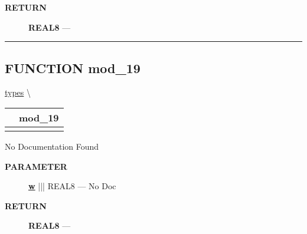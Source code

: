 \par
\begin{description}
\item [\colorbox{tagtype}{\color{white} \textbf{\textsf{RETURN}}}] \textbf{REAL8} --- 
\end{description}




\rule{\linewidth}{0.5pt}
\subsection*{\textsf{\colorbox{headtoc}{\color{white} FUNCTION}
mod\_19}}

\hypertarget{ecldoc:types.mod_19}{}
\hspace{0pt} \hyperlink{ecldoc:types}{types} \textbackslash 

{\renewcommand{\arraystretch}{1.5}
\begin{tabularx}{\textwidth}{|>{\raggedright\arraybackslash}l|X|}
\hline
\hspace{0pt}\mytexttt{\color{red} } & \textbf{mod\_19} \\
\hline
\multicolumn{2}{|>{\raggedright\arraybackslash}X|}{\hspace{0pt}\mytexttt{\color{param} (REAL8 w)}} \\
\hline
\end{tabularx}
}

\par





No Documentation Found






\par
\begin{description}
\item [\colorbox{tagtype}{\color{white} \textbf{\textsf{PARAMETER}}}] \textbf{\underline{w}} ||| REAL8 --- No Doc
\end{description}







\par
\begin{description}
\item [\colorbox{tagtype}{\color{white} \textbf{\textsf{RETURN}}}] \textbf{REAL8} --- 
\end{description}




